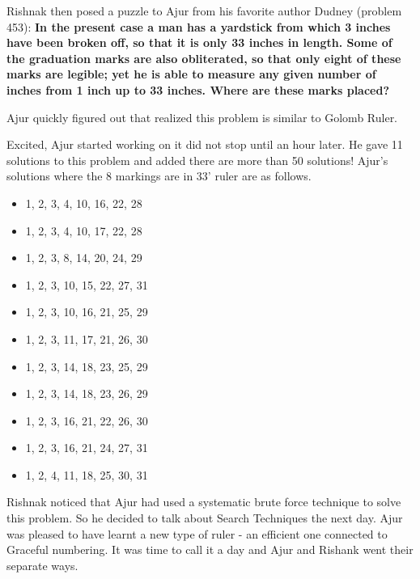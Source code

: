 Rishnak then posed a puzzle to Ajur from his favorite author Dudney (problem 453):
\textbf{In the present case a man has a yardstick from which 3 inches have
been broken off, so that it is only 33 inches in length. Some of the graduation
marks are also obliterated, so that only eight of these marks are legible; yet
he is able to measure any given number of inches from 1 inch up to 33 inches.
Where are these marks placed? }

Ajur quickly figured out that realized this problem is similar to Golomb Ruler. 

Excited, Ajur started working on it did not stop until an hour later. He gave 11 solutions to this problem and added there are more than 50 solutions! Ajur's solutions where the 8 markings are in 33' ruler are as follows.
\begin{itemize}
    \item 1, 2, 3, 4, 10, 16, 22, 28
    \item 1, 2, 3, 4, 10, 17, 22,  28
    \item 1, 2, 3, 8, 14, 20, 24, 29
    \item 1, 2, 3, 10, 15, 22, 27, 31
    \item 1, 2, 3, 10, 16, 21, 25, 29
     \item 1, 2, 3, 11, 17, 21, 26, 30
     \item 1, 2, 3, 14, 18, 23, 25, 29
     \item 1, 2, 3, 14, 18, 23, 26, 29
     \item 1, 2, 3, 16, 21, 22, 26, 30
     \item 1, 2, 3, 16, 21, 24, 27, 31
     \item 1, 2, 4, 11, 18, 25, 30, 31
\end{itemize}
Rishnak noticed that Ajur had used a systematic brute force technique to solve this problem. So he decided to talk about Search Techniques the next day.
Ajur was pleased to have learnt a new type of ruler - an efficient one connected to Graceful numbering. It was time to call it a day and Ajur and Rishank went their separate ways.